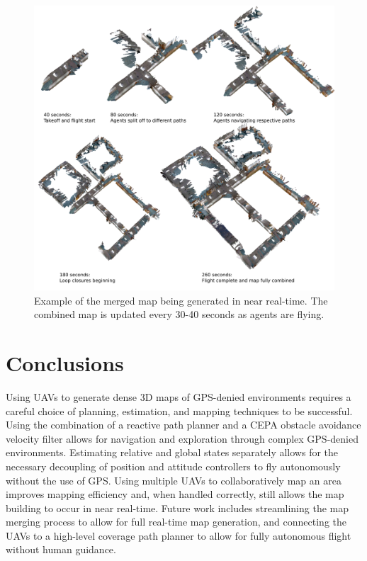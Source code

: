 \documentclass[letterpaper, 10 pt, conference]{ieeeconf}  %
\begin{document}
\begin{figure}
\centering
\includegraphics[width=1.0\linewidth]{map_merge_sequence_small.png}
\caption[An example of the map merging process over time.]{Example of the merged map being generated in near real-time. The combined map is updated every 30-40 seconds as agents are flying.}
\label{fig:map_seq}
\end{figure}

\section{Conclusions}\label{nav_conclusions}

Using UAVs to generate dense 3D maps of GPS-denied environments requires a careful choice of planning, estimation, and mapping techniques to be successful. Using the combination of a reactive path planner and a CEPA obstacle avoidance velocity filter allows for navigation and exploration through complex GPS-denied environments. Estimating relative and global states separately allows for the necessary decoupling of position and attitude controllers to fly autonomously without the use of GPS. Using multiple UAVs to collaboratively map an area improves mapping efficiency and, when handled correctly, still allows the map building to occur in near real-time. Future work includes streamlining the map merging process to allow for full real-time map generation, and connecting the UAVs to a high-level coverage path planner to allow for fully autonomous flight without human guidance.
\end{document}
